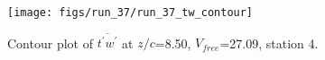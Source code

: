 \begin{figure}[H]
\centering
\texttt{[image: figs/run\_37/run\_37\_tw\_contour]}
\caption{Contour plot of $\overline{t^\prime w^\prime}$ at $z/c$=8.50, $V_{free}$=27.09, station 4.}
\label{fig:run_37_tw_contour}
\end{figure}


